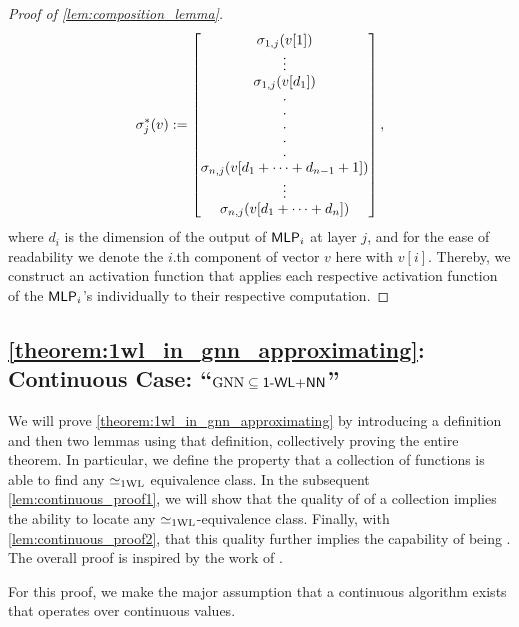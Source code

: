 \begin{proof}[Proof of \cref{lem:composition_lemma}]
    \begin{equation*}
        \sigma^*_j(v) := \begin{bmatrix}
            \sigma_{1,j}(v[1])\\
            \vspace*{-1pt}\vbox{\baselineskip=4pt \lineskiplimit=0pt \kern6pt \hbox{.}\hbox{.}\hbox{.}}\\
            \sigma_{1,j}(v[d_1])\\
            \vspace*{-1pt}\vbox{\baselineskip=10pt \lineskiplimit=0pt \kern6pt \hbox{.}\hbox{.}\hbox{.}\hbox{.}\hbox{.}}\\
            \sigma_{n,j}(v[d_1 + \dots + d_{n-1} + 1])\\
            \vspace*{-1pt}\vbox{\baselineskip=4pt \lineskiplimit=0pt \kern6pt \hbox{.}\hbox{.}\hbox{.}}\\
            \sigma_{n,j}(v[d_1 + \dots + d_{n}])
        \end{bmatrix},
    \end{equation*}
    where $d_i$ is the dimension of the output of $\textsf{MLP}_i$ at layer $j$, and for the ease of readability we denote the $i$.th component of vector $v$ here with $v[i]$. Thereby, we construct an activation function that applies each respective activation function of the $\textsf{MLP}_i$'s individually to their respective computation.
\end{proof}

\subsection{\cref*{theorem:1wl_in_gnn_approximating}: Continuous Case: ``$\text{GNN} \subseteq \textsf{1-WL+NN}$''}\label{app:gnn_in_wlnn}
We will prove \cref{theorem:1wl_in_gnn_approximating} by introducing a definition and then two lemmas using that definition, collectively proving the entire theorem. In particular, we define the property that a collection of functions is able to find any $\simeq_{\text{1WL}}$ equivalence class. In the subsequent \cref{lem:continuous_proof1}, we will show that the quality of \wldisc of a collection implies the ability to locate any $\simeq_{\text{1WL}}$-equivalence class. Finally, with \cref{lem:continuous_proof2}, that this quality further implies the capability of being \gapp. The overall proof is inspired by the work of \cite{Chen2019}.

For this proof, we make the major assumption that a continuous \wl algorithm exists that operates over continuous values.

